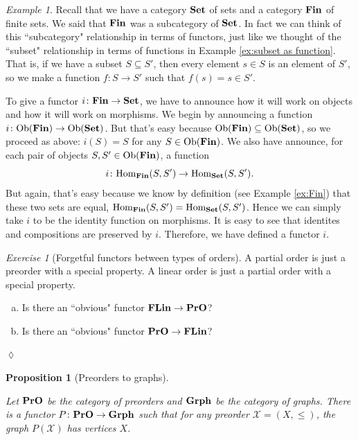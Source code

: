 \documentclass{book}
\def\tn{\textnormal}
\def\mc{\mathcal}
\def\Hom{\tn{Hom}}
\def\Ob{\tn{Ob}}
\def\to{\rightarrow}
\def\taking{\colon}
\def\ss{\subseteq}
\def\Grph{{\bf Grph}}
\def\FLin{{\bf FLin}}
\def\Set{{\bf Set}}
\def\PrO{{\bf PrO}}
\def\mcX{\mc{X}}
\newtheorem{proposition}[subsubsection]{Proposition}
\theoremstyle{remark}
\newtheorem{example}[subsubsection]{Example}
\newtheorem{exc}[subsubsection]{Exercise}
\newenvironment{exercise}{\begin{exc}}{\hspace*{\fill}$\lozenge$\end{exc}}
\theoremstyle{definition}
\def\Fin{{\bf Fin}}
\def\sexc{\begin{enumerate}[a.)]\setlength{\itemsep}{.1cm}\setlength{\parskip}{.1cm}\item}
\def\next{\item}
\def\endsexc{\end{enumerate}}
\begin{document}
\begin{example}

Recall that we have a category $\Set$ of sets and a category $\Fin$ of finite sets. We said that $\Fin$ was a subcategory of $\Set$. In fact we can think of this ``subcategory" relationship in terms of functors, just like we thought of the ``subset" relationship in terms of functions in Example \ref{ex:subset as function}. That is, if we have a subset $S\ss S'$, then every element $s\in S$ is an element of $S'$, so we make a function $f\taking S\to S'$ such that $f(s)=s\in S'$. 

To give a functor $i\taking\Fin\to\Set$, we have to announce how it will work on objects and how it will work on morphisms. We begin by announcing a function $i\taking\Ob(\Fin)\to\Ob(\Set)$. But that's easy because $\Ob(\Fin)\ss\Ob(\Set)$, so we proceed as above: $i(S)=S$ for any $S\in\Ob(\Fin)$. We also have announce, for each pair of objects $S,S'\in\Ob(\Fin)$, a function $$i\taking\Hom_\Fin(S,S')\to\Hom_\Set(S,S').$$ But again, that's easy because we know by definition (see Example \ref{ex:Fin}) that these two sets are equal, $\Hom_\Fin(S,S')=\Hom_\Set(S,S')$. Hence we can simply take $i$ to be the identity function on morphisms. It is easy to see that identites and compositions are preserved by $i$. Therefore, we have defined a functor $i$.

\end{example}

\begin{exercise}[Forgetful functors between types of orders]
A partial order is just a preorder with a special property. A linear order is just a partial order with a special property.
\sexc Is there an ``obvious" functor $\FLin\to\PrO$\index{a functor!$\FLin\to\PrO$}?
\next Is there an ``obvious" functor $\PrO\to\FLin$?
\endsexc
\end{exercise}

\begin{proposition}[Preorders to graphs]\label{prop:pro to grph}

Let $\PrO$ be the category of preorders and $\Grph$ be the category of graphs. There is a functor $P\taking\PrO\to\Grph$\index{a functor!$\PrO\to\Grph$} such that for any preorder $\mcX=(X,\leq)$, the graph $P(\mcX)$ has vertices $X$.

\end{proposition}
\end{document}
